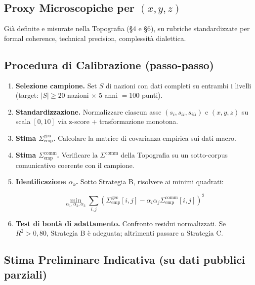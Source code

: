 \subsection{\texorpdfstring{Proxy Microscopiche per
\((x, y, z)\)}{Proxy Microscopiche per (x, y, z)}}\label{proxy-microscopiche-per-x-y-z}

Già definite e misurate nella Topografia (\S{}4 e \S{}6), su rubriche
standardizzate per formal coherence, technical precision, complessità
dialettica.

\subsection{Procedura di Calibrazione
(passo-passo)}\label{procedura-di-calibrazione-passo-passo}

\begin{enumerate}
\def\labelenumi{\arabic{enumi}.}
\item
  \textbf{Selezione campione.} Set \(S\) di nazioni con dati completi su
  entrambi i livelli (target: \(|S| \geq 20\) nazioni $\times$ 5 anni \(= 100\)
  punti).
\item
  \textbf{Standardizzazione.} Normalizzare ciascun asse
  \((s_i, s_{ii}, s_{iii})\) e \((x, y, z)\) su scala \([0, 10]\) via
  z-score + trasformazione monotona.
\item
  \textbf{Stima \(\Sigma^{\text{geo}}_{\text{emp}}\).} Calcolare la
  matrice di covarianza empirica sui dati macro.
\item
  \textbf{Stima \(\Sigma^{\text{comm}}_{\text{emp}}\).} Verificare la
  \(\Sigma^{\text{comm}}\) della Topografia su un sotto-corpus
  comunicativo coerente con il campione.
\item
  \textbf{Identificazione \(\alpha_k\).} Sotto Strategia B, risolvere ai
  minimi quadrati:

  \[\min_{\alpha_1, \alpha_2, \alpha_3} \sum_{i, j} \left( \Sigma^{\text{geo}}_{\text{emp}}[i,j] - \alpha_i \alpha_j \Sigma^{\text{comm}}_{\text{emp}}[i,j] \right)^2\]
\item
  \textbf{Test di bontà di adattamento.} Confronto residui normalizzati.
  Se \(R^2 > 0{,}80\), Strategia B è adeguata; altrimenti passare a
  Strategia C.
\end{enumerate}

\subsection{Stima Preliminare Indicativa (su dati pubblici
parziali)}\label{stima-preliminare-indicativa-su-dati-pubblici-parziali}

